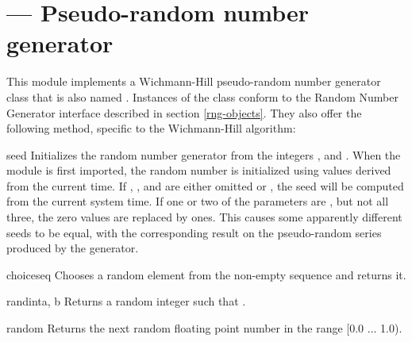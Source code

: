 \section{ ---
         Pseudo-random number generator}




This module implements a Wichmann-Hill pseudo-random number generator
class that is also named .  Instances of the
 class conform to the Random Number Generator
interface described in section \ref{rng-objects}.  They also offer the 
following method, specific to the Wichmann-Hill algorithm:

\begin{methoddesc}[whrandom]{seed}{}
  Initializes the random number generator from the integers ,
   and .  When the module is first imported, the random
  number is initialized using values derived from the current time.
  If , , and  are either omitted or , the 
  seed will be computed from the current system time.  If one or two
  of the parameters are , but not all three, the zero values
  are replaced by ones.  This causes some apparently different seeds
  to be equal, with the corresponding result on the pseudo-random
  series produced by the generator.
\end{methoddesc}

\begin{funcdesc}{choice}{seq}
Chooses a random element from the non-empty sequence  and returns it.
\end{funcdesc}

\begin{funcdesc}{randint}{a, b}
Returns a random integer  such that .
\end{funcdesc}

\begin{funcdesc}{random}{}
Returns the next random floating point number in the range [0.0 ... 1.0).
\end{funcdesc}


